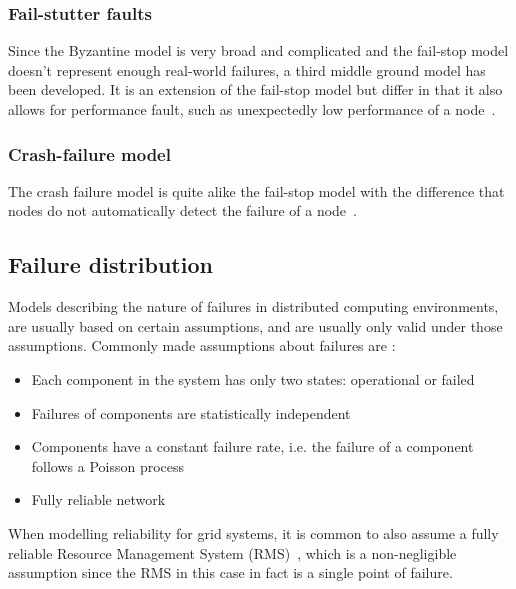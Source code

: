 \documentclass{cslthse-msc}
\begin{document}
\subsubsection{Fail-stutter faults}
Since the Byzantine model is very broad and complicated and the fail-stop model doesn't represent enough real-world failures, a third middle ground model has been developed. It is an extension of the fail-stop model but differ in that it also allows for performance fault, such as unexpectedly low performance of a node~\cite{surveyFaultParallel}.

\subsubsection{Crash-failure model}
The crash failure model is quite alike the fail-stop model with the difference that nodes do not automatically detect the failure of a node~\cite{faultTolerantFundamentals, adaptiveAgentReplication}.

\subsection{Failure distribution} \label{subsec:background_failure_distribution}
Models describing the nature of failures in distributed computing environments, are usually based on certain assumptions, and are usually only valid under those assumptions. Commonly made assumptions about failures are \cite{relModelDistSimSystem, relModelAnalysis, cloudServiceRel, studyServiceRel, hierarchicalRelModeling, selfAdaptRel}:
\begin{itemize}
	\item Each component in the system has only two states: operational or failed
	\item Failures of components are statistically independent
	\item Components have a constant failure rate, i.e. the failure of a component follows a Poisson process
	\item Fully reliable network
\end{itemize}

When modelling reliability for grid systems, it is common to also assume a fully reliable Resource Management System (RMS)~\cite{relAndPerfGridServices, relGridServicePredConstraint}, which is a non-negligible assumption since the RMS in this case in fact is a single point of failure.

\end{document}
